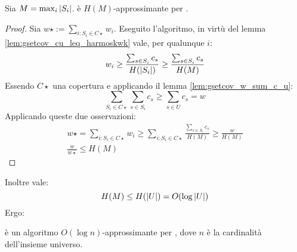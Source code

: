 \begin{theorem}
	Sia $M=\max_i| S_i |$. \GreedySetCover è $H(M)$-approssimante per \MinSetCover.
\end{theorem}
\begin{proof}
	Sia $w\star:=\sum_{i:S_i\in C\star} w_i$.
	Eseguito l'algoritmo, in virtù del lemma \ref{lem:gsetcov_cu_leq_harmoskwk} vale, per qualunque $i$:
	\begin{equation*}
		w_i\geq\frac{\sum_{s\in S_i} c_s}{H(| S_i |)}\geq\frac{\sum_{s\in S_i} c_s}{H(M)}
	\end{equation*}
	Essendo $C\star$ una copertura e applicando il lemma \ref{lem:gsetcov_w_sum_c_u}:
	\begin{equation*}
		\sum_{S_i\in C\star}\sum_{s\in S_i} c_s \geq \sum_{s\in U} c_s = w
	\end{equation*}
	Applicando queste due osservazioni:
	\begin{gather*}
		w\star = \sum_{i:S_i\in C\star} w_i \geq \sum_{i:S_i\in C\star} \frac{\sum_{s\in S_i} c_s}{H(M)} \geq \frac{w}{H(M)} \\
		\frac{w}{w\star} \leq H(M)
	\end{gather*}
\end{proof}

Inoltre vale:
\begin{equation*}
	H(M)\leq H(| U |) = O(\log | U |)
\end{equation*}
Ergo:
\begin{corollario}
	\GreedySetCover è un algoritmo $O(\log n)$-approssimante per \MinSetCover, dove $n$ è la cardinalità dell'insieme universo.
\end{corollario}

